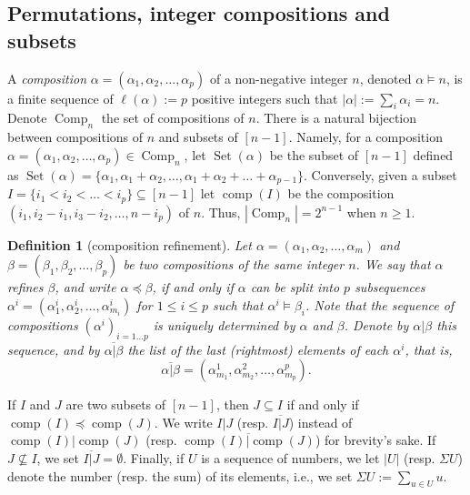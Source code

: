 \documentclass[revision]{FPSAC2025}
\newtheorem{defn}{Definition}
\newcommand{\al}{\alpha}
\newcommand{\comp}{\operatorname{comp}}
\newcommand{\Comp}{\operatorname{Comp}}
\newcommand{\Set}{\operatorname{Set}}
\begin{document}
\subsection{Permutations, integer compositions and subsets}
A \emph{composition} $\al = (\al_1, \al_2, \dots, \al_p)$ of a non-negative integer $n$, denoted $\al \vDash n$, is a finite sequence of $\ell(\al) := p$ positive integers such that $|\al| := \sum_i \al_i = n$. Denote $\Comp_n$ the set of compositions of $n$. There is a natural bijection between compositions of $n$ and subsets of $[n-1]$.
Namely, for a composition $\al = (\al_1, \al_2, \dots, \al_p) \in \Comp_n$, let $\Set(\al)$ be the subset of $[n-1]$ defined as $\Set(\al) = \{\al_1,\al_1+\al_2,\dots,\al_1+\al_2+\dots+\al_{p-1}\}$. Conversely, given a subset $I = \{i_1< i_2< \dots < i_p\} \subseteq [n-1]$ let $\comp(I)$ be the composition $(i_1, i_2-i_1,i_3 - i_2, \dots, n-i_p)$ of $n$.
Thus, $|\Comp_n| = 2^{n-1}$ when $n \geq 1$.
%
\begin{defn}[composition refinement]
Let $\alpha = (\alpha_1, \alpha_2, \dots, \alpha_m)$ and $\beta = (\beta_1, \beta_2, \dots, \beta_p)$ be two compositions of the same integer $n$. We say that $\alpha$ \emph{refines} $\beta$, and write $\alpha \preceq \beta$, if and only if $\alpha$ can be split into $p$ subsequences $\alpha^i = (\alpha^i_1, \alpha^i_2, \dots, \alpha^i_{m_i})$ for $1\leq i\leq p$ such that $\alpha^i \vDash \beta_i$.
Note that the sequence of compositions $(\alpha^i)_{i=1\dots p}$ is uniquely determined by $\alpha$ and $\beta$.
Denote by $\alpha|\beta$ this sequence, and by $\overline{\alpha|\beta}$ the list of the last (rightmost) elements of each $\alpha^i$, that is,
\[
\overline{\alpha|\beta} = (\alpha^1_{m_1}, \alpha^2_{m_2}, \dots, \alpha^p_{m_p}).
\]
\end{defn}
\noindent If $I$ and $J$ are two subsets of $[n-1]$, then $J \subseteq I$ if and only if $\comp(I) \preceq \comp(J)$. We write $I|J$ (resp. $\overline{ I|J}$) instead of $\comp(I)|{\comp(J)}$ (resp. $\overline{\comp(I)|{\comp(J)}}$) for brevity's sake. If $J \nsubseteq I$, we set $\overline{ I|J} = \emptyset$. Finally, if $U$ is a sequence of numbers, we let $|U|$ (resp. $\Sigma U$) denote the number (resp. the sum) of its elements, i.e., we set $\Sigma U := \sum\limits_{u \in U} u$.


\end{document}
